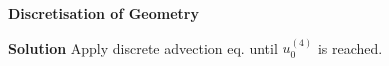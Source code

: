 \textbf{Discretisation of Geometry}


\textbf{Solution} Apply discrete advection eq. until $u_0^{(4)}$ is reached.